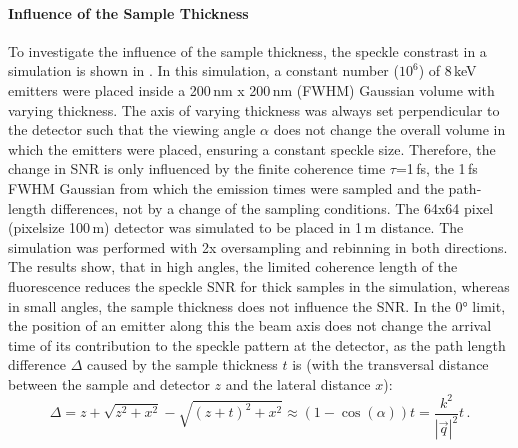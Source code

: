 \paragraph{Influence of the Sample Thickness}
To investigate the influence of the sample thickness, the speckle constrast in a simulation is shown in . In this simulation, a constant number ($10^6$) of 8\,keV emitters were placed inside a 200\,nm x 200\,nm (FWHM) Gaussian volume with varying thickness.  The axis of varying thickness was always set perpendicular to the detector such that the viewing angle $\alpha$ does not change the overall volume in which the emitters were placed, ensuring a constant speckle size. Therefore, the change in SNR is only influenced by the finite coherence time $\tau$=1\,fs, the 1\,fs FWHM Gaussian from which the emission times were sampled and the path-length differences, not by a change of the sampling conditions. The 64x64 pixel (pixelsize 100\,\textmu m) detector was simulated to be placed in 1\,m distance. The simulation was performed with 2x oversampling and rebinning in both directions.  
The results show, that in high angles, the limited coherence length of the fluorescence reduces the speckle SNR for thick samples in the simulation, whereas in small angles, the sample thickness does not influence the SNR. In the 0° limit, the position of an emitter along this the beam axis does not change the arrival time of its contribution to the speckle pattern at the detector, as the path length difference $\Delta$ caused by the sample thickness $t$ is (with the transversal distance between the sample and detector $z$ and the lateral distance $x$):
\begin{equation}
	\Delta=z+\sqrt{z^2+x^2}-\sqrt{(z+t)^2+x^2} \approx(1-\cos (\alpha)) t=\frac{k^2}{\left|\vec{q}\right|^2}t \,.
\end{equation}




